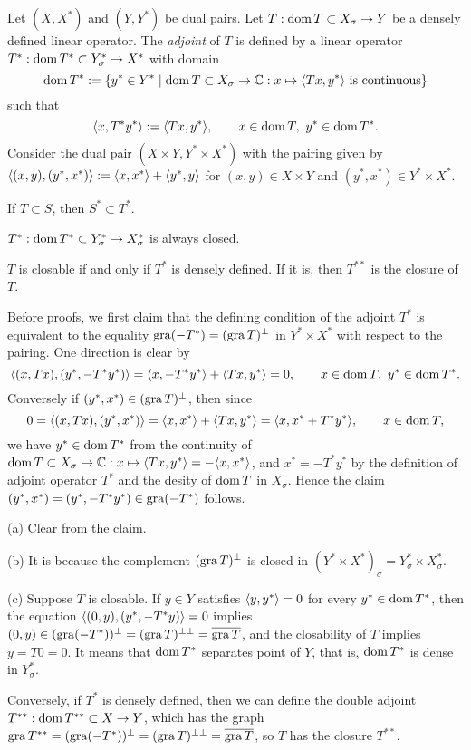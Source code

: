 \documentclass{../../large}
\begin{document}
\begin{prb}
Let $(X,X^*)$ and $(Y,Y^*)$ be dual pairs.
Let $T:\operatorname{dom} T\subset X_\sigma\to Y$ be a densely defined linear operator.
The \emph{adjoint} of $T$ is defined by a linear operator $T^*:\operatorname{dom} T^*\subset Y^*_\sigma\to X^*$ with domain
\[\operatorname{dom} T^*:=\{y^*\in Y^*\mid \operatorname{dom} T\subset X_\sigma\to\mathbb{C}:x\mapsto\langle Tx,y^*\rangle\text{ is continuous}\}\]
such that
\[\langle x,T^*y^*\rangle:=\langle Tx,y^*\rangle,\qquad x\in\operatorname{dom} T,\ y^*\in\operatorname{dom} T^*.\]
Consider the dual pair $(X\times Y,Y^*\times X^*)$ with the pairing given by $\langle(x,y),(y^*,x^*)\rangle:=\langle x,x^*\rangle+\langle y^*,y\rangle$ for $(x,y)\in X\times Y$ and $(y^*,x^*)\in Y^*\times X^*$.




\begin{parts}
\item If $T\subset S$, then $S^*\subset T^*$.
\item $T^*:\operatorname{dom} T^*\subset Y^*_\sigma\to X^*_\sigma$ is always closed.
\item $T$ is closable if and only if $T^*$ is densely defined. If it is, then $T^{**}$ is the closure of $T$.
\end{parts}
\end{prb}
\begin{pf}
Before proofs, we first claim that the defining condition of the adjoint $T^*$ is equivalent to the equality $\operatorname{gra}(-T^*)=(\operatorname{gra} T)^\perp$ in $Y^*\times X^*$ with respect to the pairing.
One direction is clear by
\[\langle(x,Tx),(y^*,-T^*y^*)\rangle=\langle x,-T^*y^*\rangle+\langle Tx,y^*\rangle=0,\qquad x\in\operatorname{dom} T,\ y^*\in\operatorname{dom} T^*.\]
Conversely if $(y^*,x^*)\in(\operatorname{gra} T)^\perp$, then since
\[0=\langle(x,Tx),(y^*,x^*)\rangle=\langle x,x^*\rangle+\langle Tx,y^*\rangle=\langle x,x^*+T^*y^*\rangle,\qquad x\in\operatorname{dom} T,\]
we have $y^*\in\operatorname{dom} T^*$ from the continuity of $\operatorname{dom} T\subset X_\sigma\to\mathbb{C}:x\mapsto\langle Tx,y^*\rangle=-\langle x,x^*\rangle$, and $x^*=-T^*y^*$ by the definition of adjoint operator $T^*$ and the desity of $\operatorname{dom} T$ in $X_\sigma$.
Hence the claim $(y^*,x^*)=(y^*,-T^*y^*)\in\operatorname{gra}(-T^*)$ follows.

(a) Clear from the claim.

(b) It is because the complement $(\operatorname{gra} T)^\perp$ is closed in $(Y^*\times X^*)_\sigma=Y^*_\sigma\times X^*_\sigma$.

(c)
Suppose $T$ is closable.
If $y\in Y$ satisfies $\langle y,y^*\rangle=0$ for every $y^*\in\operatorname{dom} T^*$, then the equation $\langle(0,y),(y^*,-T^*y)\rangle=0$ implies $(0,y)\in(\operatorname{gra}(-T^*))^\perp=(\operatorname{gra} T)^{\perp\perp}=\overline{\operatorname{gra} T}$, and the closability of $T$ implies $y=T0=0$.
It means that $\operatorname{dom} T^*$ separates point of $Y$, that is, $\operatorname{dom} T^*$ is dense in $Y^*_\sigma$.

Conversely, if $T^*$ is densely defined, then we can define the double adjoint $T^{**}:\operatorname{dom} T^{**}\subset X\to Y$, which has the graph $\operatorname{gra} T^{**}=(\operatorname{gra}(-T^*))^\perp=(\operatorname{gra} T)^{\perp\perp}=\overline{\operatorname{gra} T}$, so $T$ has the closure $T^{**}$.

\end{pf}
\end{document}

